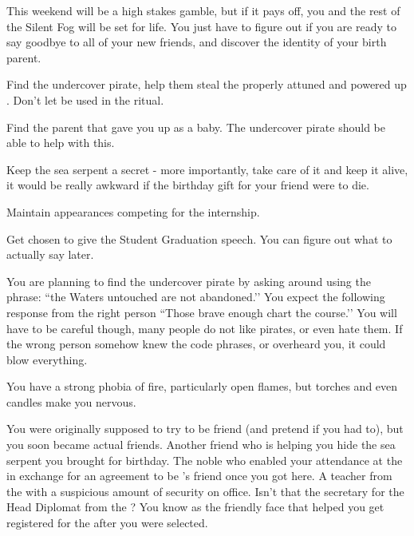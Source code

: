 \documentclass[char]{GL2020}
\begin{document}
This weekend will be a high stakes gamble, but if it pays off, you and the rest of the Silent Fog will be set for life. You just have to figure out if you are ready to say goodbye to all of your new friends, and discover the identity of your birth parent.


\begin{itemz}[Goals]
	\item Find the undercover pirate, help them steal the properly attuned and powered up \iNet{}. Don’t let \iNet{} be used in the ritual.
	\item Find the parent that gave you up as a baby. The undercover pirate should be able to help with this.
	\item Keep the sea serpent a secret - more importantly, take care of it and keep it alive, it would be really awkward if the birthday gift for your friend were to die.
	\item Maintain appearances competing for the internship.
	\item Get chosen to give the Student Graduation speech. You can figure out what to actually say later.
\end{itemz}

\begin{itemz}[Notes]
	\item You are planning to find the undercover pirate by asking around using the phrase: ``the Waters untouched are not abandoned.’’ You expect the following response from the right person ``Those brave enough chart the course.’’ You will have to be careful though, many people do not like pirates, or even hate them. If the wrong person somehow knew the code phrases, or overheard you, it could blow everything.
	\item You have a strong phobia of fire, particularly open flames, but torches and even candles make you nervous.
\end{itemz}

\begin{contacts}
	\contact{\cDisney{}} You were originally supposed to try to be \cDisney{\their} friend (and pretend if you had to), but you soon became actual friends.
	\contact{\cAdopted{}} Another friend who is helping you hide the sea serpent you brought \cDisney{} for \cDisney{\their} birthday.
	\contact{\cWildCard{}} The \pFarm{} noble \cWildCard{\person} who enabled your attendance at the \pSchool{} in exchange for an agreement to be \cDisney{}’s friend once you got here.
	\contact{\cChupInventor{}} A teacher from the \pTech{} with a suspicious amount of security on \cChupInventor{\their} office.
\contact{\cChupLeader{}} Isn’t that the secretary for the Head Diplomat from the \pShip{}? You know \cChupLeader{} as the friendly face that helped you get registered for the \pSchool{} after you were selected.
\end{contacts}
\end{document}
